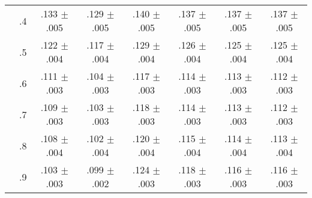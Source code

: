 \begin{tabular}{cccccccc}
 & .4 & .133 $\pm$ .005 & .129 $\pm$ .005 & .140 $\pm$ .005 & .137 $\pm$ .005 & .137 $\pm$ .005 & .137 $\pm$ .005 \\
 & .5 & .122 $\pm$ .004 & .117 $\pm$ .004 & .129 $\pm$ .004 & .126 $\pm$ .004 & .125 $\pm$ .004 & .125 $\pm$ .004 \\
 & .6 & .111 $\pm$ .003 & .104 $\pm$ .003 & .117 $\pm$ .003 & .114 $\pm$ .003 & .113 $\pm$ .003 & .112 $\pm$ .003 \\
 & .7 & .109 $\pm$ .003 & .103 $\pm$ .003 & .118 $\pm$ .003 & .114 $\pm$ .003 & .113 $\pm$ .003 & .112 $\pm$ .003 \\
 & .8 & .108 $\pm$ .004 & .102 $\pm$ .004 & .120 $\pm$ .004 & .115 $\pm$ .004 & .114 $\pm$ .004 & .113 $\pm$ .004 \\
 & .9 & .103 $\pm$ .003 & .099 $\pm$ .002 & .124 $\pm$ .003 & .118 $\pm$ .003 & .116 $\pm$ .003 & .116 $\pm$ .003 \\
\bottomrule
\end{tabular}